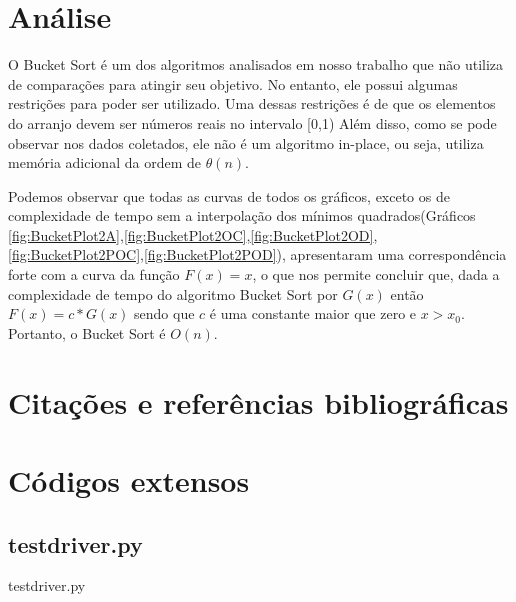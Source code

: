 \documentclass[12pt,a4paper,twoside]{report}
\begin{document}
\chapter{Análise}

O Bucket Sort é um dos algoritmos analisados em nosso trabalho que não utiliza de comparações para atingir seu objetivo. No entanto, ele possui algumas restrições para poder ser utilizado. Uma dessas restrições é de que os elementos do arranjo devem ser números reais no intervalo [0,1) Além disso, como se pode observar nos dados coletados, ele não é um algoritmo in-place, ou seja, utiliza memória adicional da ordem de $\theta (n)$.

Podemos observar que todas as curvas de todos os gráficos, exceto os de complexidade de tempo sem a interpolação dos mínimos quadrados(Gráficos \ref{fig:BucketPlot2A},\ref{fig:BucketPlot2OC},\ref{fig:BucketPlot2OD},\ref{fig:BucketPlot2POC},\ref{fig:BucketPlot2POD}), apresentaram uma correspondência forte com a curva da função $F(x) = x$, o que nos permite concluir que, dada a complexidade de tempo do algoritmo Bucket Sort por $G(x)$ então $F(x) = c * G(x)$ sendo que $c$ é uma constante maior que zero e $x > x_0$. Portanto, o Bucket Sort é $O(n)$.

\chapter{Citações e referências bibliográficas}








\clearpage
{}
\appendix

\chapter{Códigos extensos \label{ap:testdriver}}
\section{testdriver.py}
 {testdriver.py}
\end{document}
